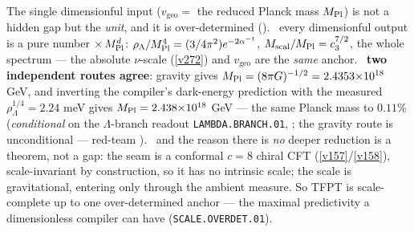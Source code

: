 \begin{keybox}
The single dimensionful input ($v_{\mathrm{geo}}=$ the reduced Planck mass $M_{\mathrm{Pl}}$) is not a hidden gap but the
\emph{unit}, and it is over-determined (). \mE\ every dimensionful output
is a pure number $\times\,M_{\mathrm{Pl}}^d$: $\rho_\Lambda/M_{\mathrm{Pl}}^4=(3/4\pi^2)e^{-2\alpha^{-1}}$, $M_{\mathrm{scal}}/M_{\mathrm{Pl}}
=c_3^{7/2}$, the whole spectrum --- the absolute $\nu$-scale (\vref{v272}) and $v_{\mathrm{geo}}$ are the
\emph{same} anchor. \mC\ \textbf{two independent routes agree}: gravity gives $M_{\mathrm{Pl}}=(8\pi G)^{-1/2}
=2.4353{\times}10^{18}$ GeV, and inverting the compiler's dark-energy prediction with the measured
$\rho_\Lambda^{1/4}=2.24$ meV gives $M_{\mathrm{Pl}}=2.438{\times}10^{18}$ GeV --- the same Planck mass to $0.11\%$
(\emph{conditional} on the $\Lambda$-branch readout \texttt{LAMBDA.BRANCH.01}, \mC; the gravity route is
unconditional --- red-team ). \mE\ and
the reason there is \emph{no} deeper reduction is a theorem, not a gap: the seam is a conformal $c{=}8$ chiral CFT
(\vref{v157}/\vref{v158}), scale-invariant by construction, so it has no intrinsic scale; the scale is
gravitational, entering only through the ambient measure. So TFPT is scale-complete up to one over-determined
anchor --- the maximal predictivity a dimensionless compiler can have (\texttt{SCALE.OVERDET.01}).
\end{keybox}

